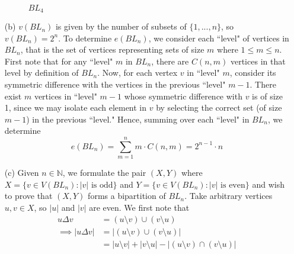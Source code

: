 \begin{ans}
\begin{itemize}
\begin{figure}[h!]
\begin{minipage}{\textwidth}
\begin{center}
{
	}
	\\
	$BL_4$
	\end{center}
	\end{minipage}
	\end{figure}
	\item[(b)] $v(BL_n)$ is given by the number of subsets of $\{1,...,n\}$, so $v(BL_n) = 2^n$. To determine $e(BL_n)$, we consider each ``level" of vertices in $BL_n$, that is the set of vertices representing sets of size $m$ where $1 \leq m \leq n$. First note that for any ``level" $m$ in $BL_n$, there are $C(n,m)$ vertices in that level by definition of $BL_n$. Now, for each vertex $v$ in ``level" $m$, consider its symmetric difference with the vertices in the previous ``level" $m-1$. There exist $m$ vertices in ``level" $m-1$ whose symmetric difference with $v$ is of size 1, since we may isolate each element in $v$ by selecting the correct set (of size $m-1$) in the previous ``level." Hence, summing over each ``level" in $BL_n$, we determine
	\begin{equation*}
		e(BL_n) = \sum_{m=1}^n {m \cdot C(n,m)} = 2^{n-1}\cdot n
	\end{equation*}
	\item[(c)] Given $n \in \mathbb{N}$, we formulate the pair $(X,Y)$ where $X = \{v \in V(BL_n): \text{$|v|$ is odd}\}$ and $Y = \{v \in V(BL_n): \text{$|v|$ is even}\}$ and wish to prove that $(X,Y)$ forms a bipartition of $BL_n$. Take arbitrary vertices $u,v \in X$, so $|u|$ and $|v|$ are even. We first note that
	\begin{align*}
		u \Delta v &= (u \setminus v) \cup (v \setminus u) \\
		\implies |u \Delta v| &= |(u \setminus v) \cup (v \setminus u)| \\
							  &= |u \setminus v| + |v \setminus u| - |(u \setminus v) \cap (v \setminus u)| \\

\end{align*}
\end{itemize}
\end{ans}

